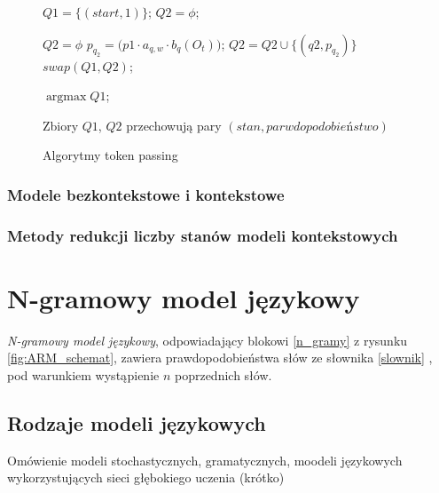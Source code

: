 \documentclass[11pt]{article}
\DeclareMathOperator*{\argmax}{\arg\max}   %
\newcommand{\refBlock}[1]{%
	\hyperref[#1]{\ref*{#1}}%
}
\begin{document}
		    \begin{figure}
		    	\begin{algorithmic}[1]
		    		
		    		
		    		\STATE $Q1 = \{(start, 1)\}$; 
		    		\STATE $Q2 = \phi$;		    
		    		
			    		\STATE $Q2 = \phi$
					    		\STATE $p_{q_2} = \bigg( p1\cdot a_{q,w}\cdot b_q(O_t) \label{line:b_q} \bigg)$;				    	
					    		\STATE $Q2 = Q2 \cup \{(q2, p_{q_2})\}$
				    		\ENDFOR
			    		\ENDFOR
			    		\STATE $swap(Q1, Q2)$;
		    		\ENDFOR
		    		
		    		\RETURN $\argmax{Q1}$;
		    	\end{algorithmic}
	    	
		    	Zbiory $Q1$, $Q2$ przechowują pary $(stan, parwdopodobieństwo)$ 
		    	
		    	\caption{Algorytmy token passing}
		    	\label{alg:token_passing}
		    \end{figure}		
		    
		    
       \subsubsection{ Modele bezkontekstowe i kontekstowe}
       \subsubsection{ Metody redukcji liczby stanów modeli kontekstowych }	
       \label{sec:state_red}

\section{N-gramowy model językowy}
	\label{sec:ngramm}
	\textit{N-gramowy model językowy}, odpowiadający blokowi \refBlock{n_gramy} z rysunku \ref{fig:ARM_schemat}, zawiera prawdopodobieństwa słów ze słownika \refBlock{slownik}, pod warunkiem wystąpienie $n$ poprzednich słów.
	
	
    \subsection{ Rodzaje modeli językowych }
      Omówienie modeli stochastycznych, gramatycznych, moodeli językowych wykorzystujących sieci głębokiego uczenia (krótko)
\end{document}
